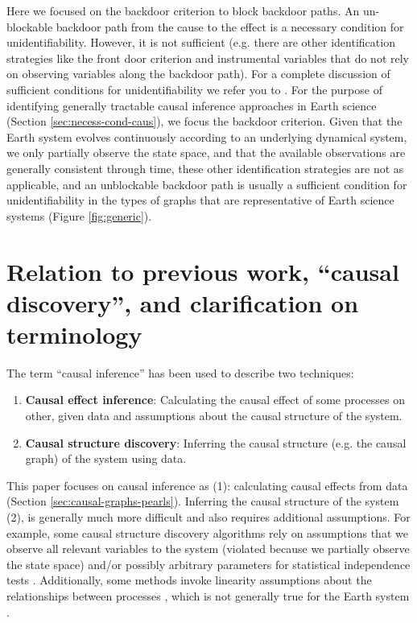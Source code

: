 \documentclass[12pt]{article}
\begin{document}
Here we focused on the backdoor criterion to block backdoor paths. An
un-blockable backdoor path from the cause to the effect is a necessary
condition for unidentifiability. However, it is not sufficient
(e.g. there are other identification strategies like the front door
criterion and instrumental variables that do not rely on observing
variables along the backdoor path). For a complete discussion of
sufficient conditions for unidentifiability we refer you to
\citet{shpitser2006}. For the purpose of identifying generally
tractable causal inference approaches in Earth science (Section
\ref{sec:necess-cond-caus}), we focus the backdoor criterion. Given
that the Earth system evolves continuously according to an underlying
dynamical system, we only partially observe the state space, and that
the available observations are generally consistent through time,
these other identification strategies are not as applicable, and an
unblockable backdoor path is usually a sufficient condition for
unidentifiability in the types of graphs that are representative of
Earth science systems (Figure \ref{fig:generic}).

\section{Relation to previous work, ``causal discovery'', and
  clarification on terminology}
\label{sec:discovery}

The term ``causal inference'' has been used to describe two
techniques:

\begin{enumerate}
\item \textbf{Causal effect inference}: Calculating the causal effect
  of some processes on other, given data and assumptions about the
  causal structure of the system.
\item \textbf{Causal structure discovery}: Inferring the causal
  structure (e.g. the causal graph) of the system using data.
\end{enumerate}

This paper focuses on causal inference as (1): calculating causal
effects from data (Section \ref{sec:causal-graphs-pearls}). Inferring
the causal structure of the system (2), is generally much more
difficult and also requires additional assumptions. For example, some
causal structure discovery algorithms rely on assumptions that we
observe all relevant variables to the system (violated because we
partially observe the state space) and/or possibly arbitrary
parameters for statistical independence tests
\citep{runge2019inferring}. Additionally, some methods invoke
linearity assumptions about the relationships between processes
\citep{krich2019causal}, which is not generally true for the Earth
system \citep{palmer-nonlinaer-1999}.
\end{document}

